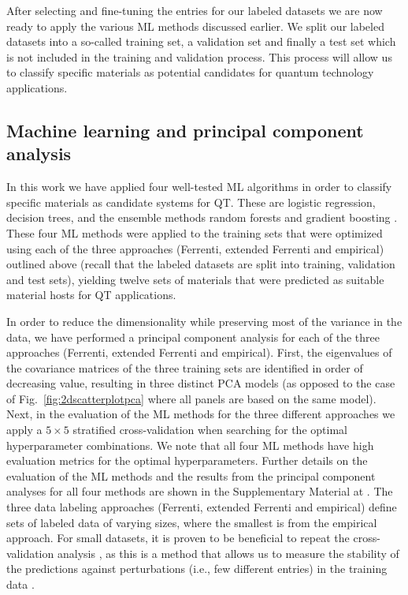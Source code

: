 \documentclass[superscriptaddress,unsortedaddress,
 amsmath,amssymb,
 aps,
]{revtex4-2}
\begin{document}

After selecting and fine-tuning the entries for our labeled datasets we are now ready to apply the various ML methods discussed earlier. We split our labeled datasets into a so-called training set, a validation set and finally a test set which is not included in the training and validation process. This process will allow us to classify specific materials as potential candidates for quantum technology applications. 

\subsection*{Machine learning and principal component analysis}
In this work we have applied four well-tested ML algorithms in order to classify specific materials as candidate systems for QT. These are logistic regression, decision trees, and the ensemble methods random forests and gradient boosting \cite{Mehta2019,Hastie2009,Murphy2012}. 
These four ML methods were applied to the training sets that were optimized using each of the three approaches (Ferrenti, extended Ferrenti and empirical) outlined above (recall that the labeled datasets are split into training, validation and test sets), yielding twelve sets of materials that were predicted as suitable material hosts for QT applications.  

In order to reduce the dimensionality while preserving most of the variance in the data, 
we have performed a principal component analysis  \cite{Jolliffe2002} for each of the three approaches (Ferrenti, extended Ferrenti and empirical).
First, the eigenvalues of the covariance matrices of the three training sets are identified in order of decreasing value, resulting in three distinct PCA models (as opposed to the case of Fig.~\ref{fig:2dscatterplotpca} where all panels are based on the same model). 
%
Next, in the evaluation of the ML methods for the three different approaches we apply a $5\times 5$ stratified cross-validation \cite{Hastie2009} when searching for the optimal hyperparameter combinations. We note that all four ML methods have high evaluation metrics for the optimal hyperparameters. Further details on the evaluation of the ML methods and the results from the principal component analyses for all four methods are shown in the Supplementary Material at \cite{supplementary}.  
%
The three data labeling approaches (Ferrenti, extended Ferrenti and empirical) define sets of labeled data of varying sizes, where the smallest is from the empirical approach. For small datasets, it is proven to be beneficial to repeat the cross-validation analysis \cite{Hastie2009}, as this is a method that allows us to measure the stability of the predictions against perturbations (i.e., few different entries) in the training data \cite{Beleites2008}.
\end{document}
